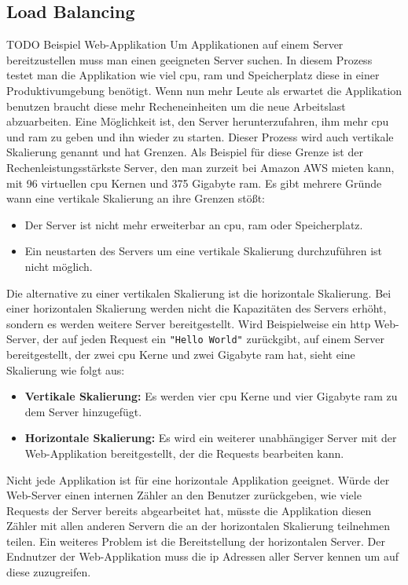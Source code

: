 \subsection{Load Balancing}
TODO Beispiel Web-Applikation
Um Applikationen auf einem Server bereitzustellen muss man einen geeigneten Server suchen. In diesem Prozess testet man die Applikation wie viel \acs{cpu}, \acs{ram} und Speicherplatz diese in einer Produktivumgebung benötigt. Wenn nun mehr Leute als erwartet die Applikation benutzen braucht diese mehr Recheneinheiten um die neue Arbeitslast abzuarbeiten. Eine Möglichkeit ist, den Server herunterzufahren, ihm mehr \acs{cpu} und \acs{ram} zu geben und ihn wieder zu starten. Dieser Prozess wird auch vertikale Skalierung genannt und hat Grenzen.\cite{bourkeServerLoadBalancing2001}
Als Beispiel für diese Grenze ist der Rechenleistungsstärkste Server, den man zurzeit bei Amazon AWS mieten kann, mit 96 virtuellen \acs{cpu} Kernen und 375 Gigabyte \acs{ram}.\cite{EC2OnDemandInstance}
Es gibt mehrere Gründe wann eine vertikale Skalierung an ihre Grenzen stö{\ss}t:
\begin{itemize}
    \item Der Server ist nicht mehr erweiterbar an \acs{cpu}, \acs{ram} oder Speicherplatz.
    \item Ein neustarten des Servers um eine vertikale Skalierung durchzuführen ist nicht möglich.
\end{itemize}
\cite{bourkeServerLoadBalancing2001}
Die alternative zu einer vertikalen Skalierung ist die horizontale Skalierung. Bei einer horizontalen Skalierung werden nicht die Kapazitäten des Servers erhöht, sondern es werden weitere Server bereitgestellt.
Wird Beispielweise ein \acs{http} Web-Server, der auf jeden Request ein \verb|"Hello World"| zurückgibt, auf einem Server bereitgestellt, der zwei \ac{cpu} Kerne und zwei Gigabyte \ac{ram} hat, sieht eine Skalierung wie folgt aus:
\begin{itemize}
    \item \textbf{Vertikale Skalierung:} Es werden vier \ac{cpu} Kerne und vier Gigabyte \ac{ram} zu dem Server hinzugefügt.
    \item \textbf{Horizontale Skalierung:} Es wird ein weiterer unabhängiger Server mit der Web-Applikation bereitgestellt, der die Requests bearbeiten kann.
\end{itemize}
Nicht jede Applikation ist für eine horizontale Applikation geeignet. Würde der Web-Server einen internen Zähler an den Benutzer zurückgeben, wie viele Requests der Server bereits abgearbeitet hat, müsste die Applikation diesen Zähler mit allen anderen Servern die an der horizontalen Skalierung teilnehmen teilen.
Ein weiteres Problem ist die Bereitstellung der horizontalen Server. Der Endnutzer der Web-Applikation muss die \ac{ip} Adressen aller Server kennen um auf diese zuzugreifen.

